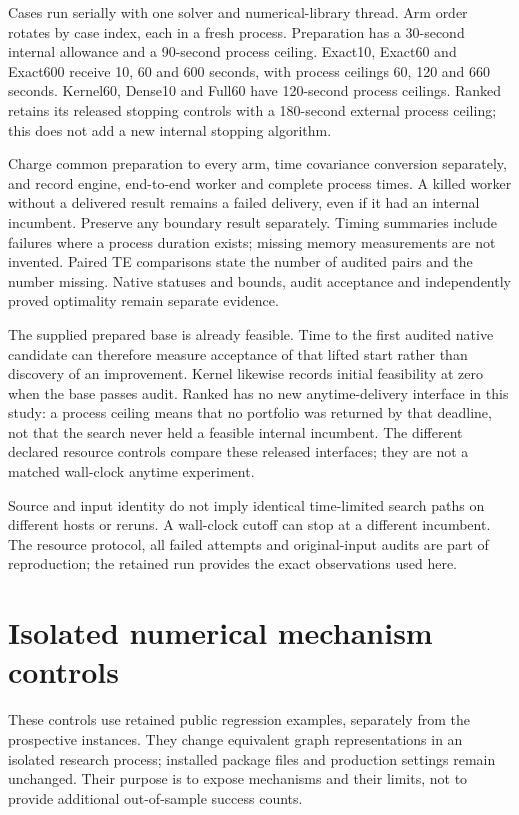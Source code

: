 \documentclass[11pt]{article}
\begin{document}
Cases run serially with one solver and numerical-library thread. Arm order
rotates by case index, each in a fresh process. Preparation has a 30-second
internal allowance and a 90-second process ceiling. Exact10, Exact60 and
Exact600 receive 10, 60 and 600 seconds, with process ceilings 60, 120 and
660 seconds. Kernel60, Dense10 and Full60 have 120-second process ceilings.
Ranked retains its released stopping controls with a 180-second external
process ceiling; this does not add a new internal stopping algorithm.

Charge common preparation to every arm, time covariance conversion separately,
and record engine, end-to-end worker and complete process times. A killed
worker without a delivered result remains a failed delivery, even if it had
an internal incumbent. Preserve any boundary result separately. Timing
summaries include failures where a process duration exists; missing memory
measurements are not invented. Paired TE comparisons state the number of
audited pairs and the number missing. Native statuses and bounds, audit
acceptance and independently proved optimality remain separate evidence.

The supplied prepared base is already feasible. Time to the first audited native
candidate can therefore measure acceptance of that lifted start rather than
discovery of an improvement. Kernel likewise records initial feasibility at
zero when the base passes audit. Ranked has no new anytime-delivery interface
in this study: a process ceiling means that no portfolio was returned by that
deadline, not that the search never held a feasible internal incumbent. The
different declared resource controls compare these released interfaces; they
are not a matched wall-clock anytime experiment.

Source and input identity do not imply identical time-limited search paths on
different hosts or reruns. A wall-clock cutoff can stop at a different incumbent.
The resource protocol, all failed attempts and original-input audits are part
of reproduction; the retained run provides the exact observations used here.

\section{Isolated numerical mechanism controls}
These controls use retained public regression examples, separately from the
prospective instances. They change equivalent graph representations in an
isolated research process; installed package files and production settings
remain unchanged. Their purpose is to expose mechanisms and their limits,
not to provide additional out-of-sample success counts.
\end{document}
